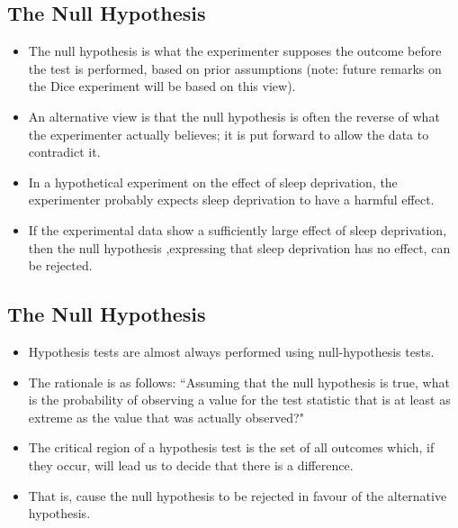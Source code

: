 \documentclass[]{article}
\begin{document}
\subsection{The Null Hypothesis }

\begin{itemize}
	\item The null hypothesis is what the experimenter supposes the outcome before the test is performed, based on prior assumptions (note:  future remarks on the Dice experiment will be based on this view).
	\item An alternative view is that the null hypothesis is often the reverse of what the experimenter actually believes; it is put forward to allow the data to contradict it. \item In a hypothetical experiment on the effect of sleep deprivation, the experimenter probably expects sleep deprivation to have a harmful effect. \item If the experimental data show a sufficiently large effect of sleep deprivation, then the null hypothesis ,expressing that sleep deprivation has no effect, can be rejected.
\end{itemize}




\subsection{The Null Hypothesis }

\begin{itemize}
	\item Hypothesis tests are almost always performed using null-hypothesis tests.
	
	\item The rationale is as follows: ``Assuming that the null hypothesis is true, what is the probability of observing a value for the test statistic that is at least as extreme as the value that was actually observed?"
	\item
	The critical region of a hypothesis test is the set of all outcomes which, if they occur, will lead us to decide that there is a difference.
	\item That is, cause the null hypothesis to be rejected in favour of the alternative hypothesis.
\end{itemize}
\end{document}
